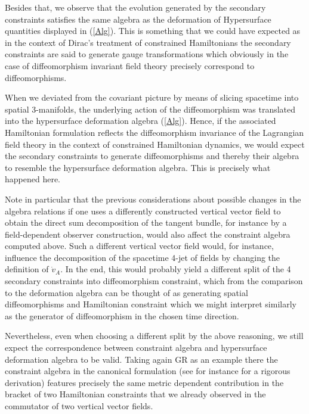 Besides that, we observe that the evolution generated by the secondary constraints satisfies the same algebra as the deformation of Hypersurface quantities displayed in (\ref{Alg}). This is something that we could have expected as in the context of Dirac's treatment of constrained Hamiltonians the secondary constraints are said to generate gauge transformations which obviously in the case of diffeomorphism invariant field theory precisely correspond to diffeomorphisms. 

When we deviated from the covariant picture by means of slicing spacetime into spatial 3-manifolds, the underlying action of the diffeomorphism was translated into the hypersurface deformation algebra (\ref{Alg}).
Hence, if the associated Hamiltonian formulation reflects the diffeomorphism invariance of the Lagrangian field theory in the context of constrained Hamiltonian dynamics, we would expect the secondary constraints to generate diffeomorphisms and thereby their algebra to resemble the hypersurface deformation algebra. This is precisely what happened here.

Note in particular that the previous considerations about possible changes in the algebra relations if one uses a differently constructed vertical vector field to obtain the direct sum decomposition of the tangent bundle, for instance by a field-dependent observer construction, would also affect the constraint algebra computed above. Such a different vertical vector field would, for instance, influence the decomposition of the spacetime 4-jet of fields by changing the definition of $\dot{v}_A$. In the end, this would probably yield a different split of the 4 secondary constraints into diffeomorphism constraint, which from the comparison to the deformation algebra can be thought of as generating spatial diffeomorphisms and Hamiltonian constraint which we might interpret similarly as the generator of diffeomorphism in the chosen time direction. 

Nevertheless, even when choosing a different split by the above reasoning, we still expect the correspondence between constraint algebra and hypersurface deformation algebra to be valid. Taking again GR as an example there the constraint algebra in the canonical formulation (see for instance \cite{thiemann_2007} for a rigorous derivation) features precisely the same metric dependent contribution in the bracket of two Hamiltonian constraints that we already observed in the commutator of two vertical vector fields. \\

